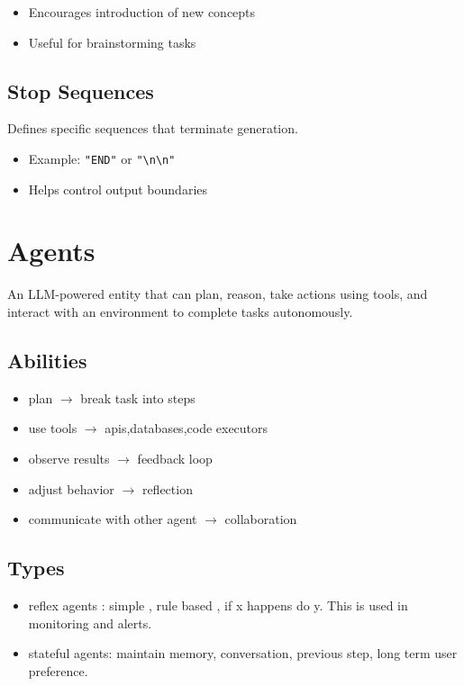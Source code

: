 \documentclass[10pt,a4paper]{article}
\begin{document}
\begin{itemize}
    \item Encourages introduction of new concepts
    \item Useful for brainstorming tasks
\end{itemize}

\subsection{Stop Sequences}
Defines specific sequences that terminate generation.

\begin{itemize}
    \item Example: \texttt{"END"} or \texttt{"\textbackslash n\textbackslash n"}
    \item Helps control output boundaries
\end{itemize}



\section{Agents}\label{agents}

An LLM-powered entity that can plan, reason, take actions using tools, and interact with an environment to complete tasks autonomously.

\subsection{Abilities}\label{abilities}

\begin{itemize}
\item
  plan \(\rightarrow\) break task into steps
\item
  use tools \(\rightarrow\) apis,databases,code executors
\item
  observe results \(\rightarrow\) feedback loop
\item
  adjust behavior \(\rightarrow\) reflection
\item
  communicate with other agent \(\rightarrow\) collaboration
\end{itemize}

\subsection{Types}\label{types}

\begin{itemize}
\item
  reflex agents : simple , rule based , if x happens do y. This is used in monitoring and alerts.
\item
  stateful agents: maintain memory, conversation, previous step, long term user preference.
\end{itemize}
\end{document}
